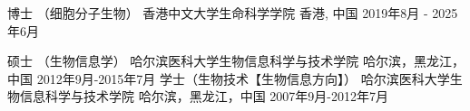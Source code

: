 

\begin{cventries}

    \cventry
        {博士 （细胞分子生物）} %
        {香港中文大学生命科学学院} %
        {香港, 中国} %
        {2019年8月 - 2025年6月} %
        {
        }

    \cventry
        {硕士 （生物信息学）} %
        {哈尔滨医科大学生物信息科学与技术学院} %
        {哈尔滨，黑龙江，中国} %
        {2012年9月-2015年7月} %
        {
        }
    \cventry
        {学士（生物技术【生物信息方向】）} %
        {哈尔滨医科大学生物信息科学与技术学院} %
        {哈尔滨，黑龙江，中国} %
        {2007年9月-2012年7月} %
        {
        }

\end{cventries}